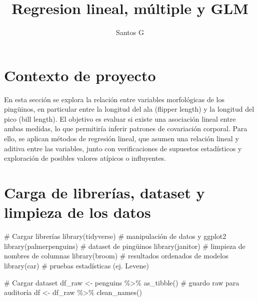 \documentclass[
  spanish,
  11pt,
  a4paper,
  DIV=11,
  numbers=noendperiod]{scrartcl}
\title{Regresion lineal, múltiple y GLM}
\author{Santos G}
\date{}
\newenvironment{Shaded}{\begin{snugshade}}{\end{snugshade}}
\newcommand{\CommentTok}[1]{\textcolor[rgb]{0.37,0.37,0.37}{#1}}
\newcommand{\FunctionTok}[1]{\textcolor[rgb]{0.28,0.35,0.67}{#1}}
\newcommand{\NormalTok}[1]{\textcolor[rgb]{0.00,0.23,0.31}{#1}}
\newcommand{\OtherTok}[1]{\textcolor[rgb]{0.00,0.23,0.31}{#1}}
\newcommand{\SpecialCharTok}[1]{\textcolor[rgb]{0.37,0.37,0.37}{#1}}
\renewcommand*\contentsname{Tabla de contenidos}
\newcommand\contentsname{Tabla de contenidos}
\begin{document}
\maketitle

\renewcommand*\contentsname{Tabla de contenidos}
{
\hypersetup{linkcolor=}
\setcounter{tocdepth}{2}
\tableofcontents
}

\section{Contexto de proyecto}\label{contexto-de-proyecto}

En esta sección se explora la relación entre variables morfológicas de
los pingüinos, en particular entre la longitud del ala (flipper length)
y la longitud del pico (bill length). El objetivo es evaluar si existe
una asociación lineal entre ambas medidas, lo que permitiría inferir
patrones de covariación corporal. Para ello, se aplican métodos de
regresión lineal, que asumen una relación lineal y aditiva entre las
variables, junto con verificaciones de supuestos estadísticos y
exploración de posibles valores atípicos o influyentes.

\section{Carga de librerías, dataset y limpieza de los
datos}\label{carga-de-libreruxedas-dataset-y-limpieza-de-los-datos}

\begin{Shaded}
\begin{Highlighting}[numbers=left,,]
\CommentTok{\# Cargar librerías}
\FunctionTok{library}\NormalTok{(tidyverse)    }\CommentTok{\# manipulación de datos y ggplot2}
\FunctionTok{library}\NormalTok{(palmerpenguins) }\CommentTok{\# dataset de pingüinos}
\FunctionTok{library}\NormalTok{(janitor)      }\CommentTok{\# limpieza de nombres de columnas}
\FunctionTok{library}\NormalTok{(broom)        }\CommentTok{\# resultados ordenados de modelos}
\FunctionTok{library}\NormalTok{(car)          }\CommentTok{\# pruebas estadísticas (ej. Levene)}

\CommentTok{\# Cargar dataset}
\NormalTok{df\_raw }\OtherTok{\textless{}{-}}\NormalTok{ penguins }\SpecialCharTok{\%\textgreater{}\%} \FunctionTok{as\_tibble}\NormalTok{() }\CommentTok{\# guardo raw para auditoría}
\NormalTok{df }\OtherTok{\textless{}{-}}\NormalTok{ df\_raw }\SpecialCharTok{\%\textgreater{}\%} \FunctionTok{clean\_names}\NormalTok{()}
\end{Highlighting}
\end{Shaded}
\end{document}
